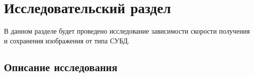 \chapter{Исследовательский раздел}

В данном разделе будет проведено исследование зависимости скорости получения и сохранения изображения от типа СУБД.

\section{Описание исследования}

